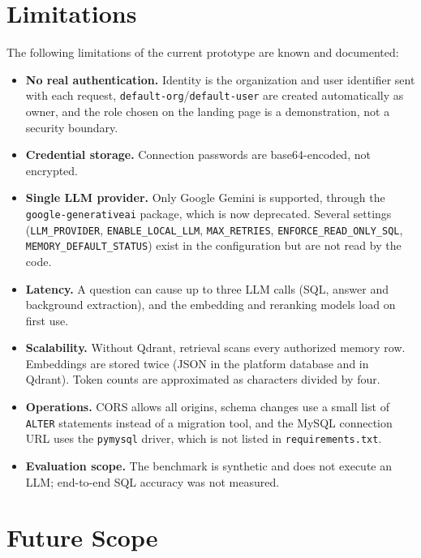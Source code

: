 \section{Limitations}
The following limitations of the current prototype are known and documented:
\begin{itemize}[leftmargin=*, topsep=4pt, itemsep=3pt]
    \item \textbf{No real authentication.} Identity is the organization and user identifier
          sent with each request, \texttt{default-org}/\texttt{default-user} are created
          automatically as owner, and the role chosen on the landing page is a
          demonstration, not a security boundary.
    \item \textbf{Credential storage.} Connection passwords are base64-encoded, not
          encrypted.
    \item \textbf{Single LLM provider.} Only Google Gemini is supported, through the
          \texttt{google-generativeai} package, which is now deprecated. Several settings
          (\texttt{LLM\_PROVIDER}, \texttt{ENABLE\_LOCAL\_LLM}, \texttt{MAX\_RETRIES},
          \texttt{ENFORCE\_READ\_ONLY\_SQL}, \texttt{MEMORY\_DEFAULT\_STATUS}) exist in the
          configuration but are not read by the code.
    \item \textbf{Latency.} A question can cause up to three LLM calls (SQL, answer and
          background extraction), and the embedding and reranking models load on first use.
    \item \textbf{Scalability.} Without Qdrant, retrieval scans every authorized memory row.
          Embeddings are stored twice (JSON in the platform database and in Qdrant). Token
          counts are approximated as characters divided by four.
    \item \textbf{Operations.} CORS allows all origins, schema changes use a small list of
          \texttt{ALTER} statements instead of a migration tool, and the MySQL connection URL
          uses the \texttt{pymysql} driver, which is not listed in \texttt{requirements.txt}.
    \item \textbf{Evaluation scope.} The benchmark is synthetic and does not execute an LLM;
          end-to-end SQL accuracy was not measured.
\end{itemize}

\section{Future Scope}

